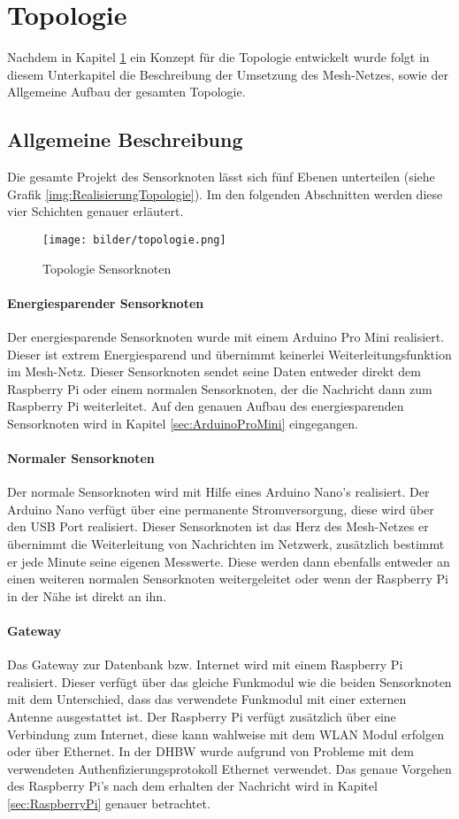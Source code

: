 \section{Topologie}
Nachdem in Kapitel \ref{sec:KonzeptionMeshNetz} ein Konzept für die Topologie entwickelt wurde folgt in diesem Unterkapitel die Beschreibung der Umsetzung des Mesh-Netzes, sowie der Allgemeine Aufbau der gesamten Topologie. 
\subsection{Allgemeine Beschreibung}
Die gesamte Projekt des Sensorknoten lässt sich fünf Ebenen unterteilen (siehe Grafik \ref{img:RealisierungTopologie}). Im den folgenden Abschnitten werden diese vier Schichten genauer erläutert.
\begin{figure}
	\centering
	\texttt{[image: bilder/topologie.png]}
	\caption{Topologie Sensorknoten}
	\label{sec:KonzeptionMeshNetz}
\end{figure}
\paragraph{Energiesparender Sensorknoten} Der energiesparende Sensorknoten wurde mit einem Arduino Pro Mini realisiert. Dieser ist extrem Energiesparend und übernimmt keinerlei Weiterleitungsfunktion im Mesh-Netz. Dieser Sensorknoten sendet seine Daten entweder direkt dem Raspberry Pi oder einem normalen Sensorknoten, der die Nachricht dann zum Raspberry Pi weiterleitet. Auf den genauen Aufbau des energiesparenden Sensorknoten wird in Kapitel \ref{sec:ArduinoProMini} eingegangen.
\paragraph{Normaler Sensorknoten} Der normale Sensorknoten wird mit Hilfe eines Arduino Nano’s realisiert. Der Arduino Nano verfügt über eine permanente Stromversorgung, diese wird über den USB Port realisiert. Dieser Sensorknoten ist das Herz des Mesh-Netzes er übernimmt die Weiterleitung von Nachrichten im Netzwerk, zusätzlich bestimmt er jede Minute seine eigenen Messwerte. Diese werden dann ebenfalls entweder an einen weiteren normalen Sensorknoten weitergeleitet oder wenn der Raspberry Pi in der Nähe ist direkt an ihn. 
\paragraph{Gateway} Das Gateway zur Datenbank bzw. Internet wird mit einem Raspberry Pi realisiert. Dieser verfügt über das gleiche Funkmodul wie die beiden Sensorknoten mit dem Unterschied, dass das verwendete Funkmodul mit einer externen Antenne ausgestattet ist. Der Raspberry Pi verfügt zusätzlich über eine Verbindung zum Internet, diese kann wahlweise mit dem WLAN Modul erfolgen oder über Ethernet. In der DHBW wurde aufgrund von Probleme mit dem verwendeten Authenfizierungsprotokoll  Ethernet verwendet. Das genaue Vorgehen des Raspberry Pi’s nach dem erhalten der Nachricht wird in Kapitel \ref{sec:RaspberryPi} genauer betrachtet.
